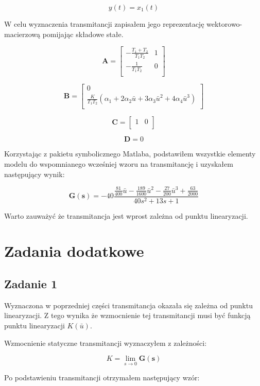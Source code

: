 \documentclass[a4paper,titlepage,11pt,floatssmall]{mwrep}
\begin{document}
\begin{equation*}
y(t) = x_1(t)
\end{equation*}

W celu wyznaczenia transmitancji zapisałem jego reprezentację wektorowo-macierzową pomijając składowe stałe.

$$
\mathbf{A} =
\left[ \begin{array}{cc}
-\frac{T_1 + T_2}{T_1 T_2} & 1  \\
-\frac{1}{T_1 T_2} & 0  \\
\end{array} \right]
$$

$$
\mathbf{B} =
\left[\begin{array}{c}
0 \\
\frac{K}{T_1 T_2}(\alpha_1 + 2\alpha_2\bar{u} + 3\alpha_3\bar{u}^2 + 4\alpha_4\bar{u}^3) \\
\end{array} \right]
$$

$$
\mathbf{C} =
\left[ \begin{array}{cc}
1 & 0\\
\end{array} \right]
$$

$$
\mathbf{D} = 0
$$

Korzystając z pakietu symbolicznego Matlaba, podstawiłem wszystkie elementy modelu do wspomnianego wcześniej wzoru na transmitancję i uzyskałem następujący wynik:

$$
\mathbf{G(s)} = -40\frac{\frac{81}{400}\bar{u} - \frac{189}{1600}\bar{u}^2 - \frac{27}{200}\bar{u}^3 + \frac{63}{2000}}{40s^2 + 13s + 1}
$$

Warto zauważyć że transmitancja jest wprost zależna od punktu linearyzacji.


\chapter{Zadania dodatkowe}
\section{Zadanie 1}
Wyznaczona w poprzedniej części transmitancja okazała się zależna od punktu linearyzacji. Z tego wynika że wzmocnienie tej transmitancji musi być funkcją punktu linearyzacji $K(\bar{u})$.

Wzmocnienie statyczne transmitancji wyznaczyłem z zależności:

$$
K = \lim_{s\to 0} \mathbf{G(s)}
$$

Po podstawieniu transmitancji otrzymałem następujący wzór:
\end{document}
